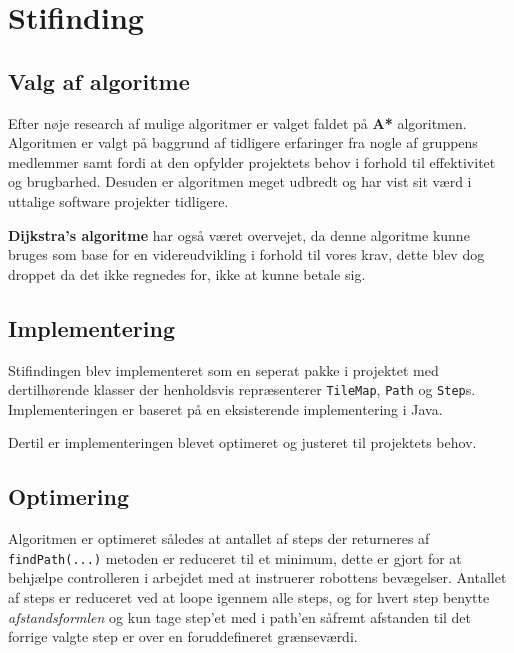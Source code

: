 \chapter{Stifinding}

\section{Valg af algoritme}
Efter nøje research af mulige algoritmer er valget faldet på \textbf{A*} algoritmen.
Algoritmen er valgt på baggrund af tidligere erfaringer fra nogle af gruppens medlemmer samt fordi at den opfylder projektets behov i forhold til effektivitet og brugbarhed. Desuden er algoritmen meget udbredt og har vist sit værd i uttalige software projekter tidligere.

\textbf{Dijkstra's algoritme} har også været overvejet, da denne algoritme kunne bruges som base for en videreudvikling i forhold til vores krav, dette blev dog droppet da det ikke regnedes for, ikke at kunne betale sig.

\section{Implementering}
Stifindingen blev implementeret som en seperat pakke i projektet med dertilhørende klasser der henholdsvis repræsenterer \texttt{TileMap}, \texttt{Path} og \texttt{Step}s. Implementeringen er baseret på en eksisterende implementering i Java. \cite{astar} 

Dertil er implementeringen blevet optimeret og justeret til projektets behov.

\section{Optimering}
Algoritmen er optimeret således at antallet af steps der returneres af \texttt{findPath(...)} metoden er reduceret til et minimum, dette er gjort for at behjælpe controlleren i arbejdet med at instruerer robottens bevægelser. Antallet af steps er reduceret ved at loope igennem alle steps, og for hvert step benytte \textit{afstandsformlen} og kun tage step'et med i path'en såfremt afstanden til det forrige valgte step er over en foruddefineret grænseværdi.